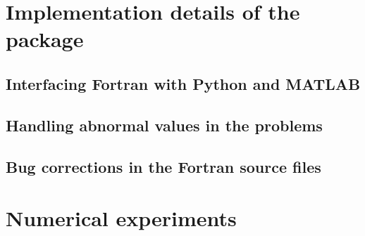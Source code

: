 \section{Implementation details of the  package}

\subsection{Interfacing Fortran with Python and MATLAB}

\subsection{Handling abnormal values in the problems}

\subsection{Bug corrections in the Fortran source files}

\section{Numerical experiments}
